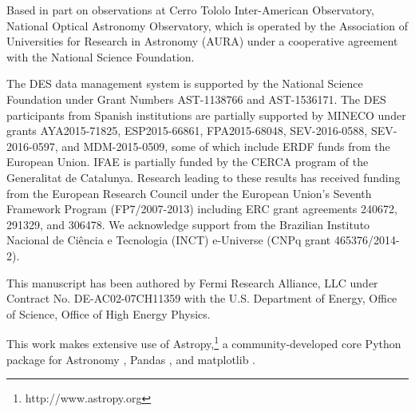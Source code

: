 \documentclass[fleqn,usenatbib,]{mnras}
\begin{document}
Based in part on observations at Cerro Tololo Inter-American Observatory, National Optical Astronomy Observatory, which is operated by the Association of 
Universities for Research in Astronomy (AURA) under a cooperative agreement with the National Science Foundation.

The DES data management system is supported by the National Science Foundation under Grant Numbers AST-1138766 and AST-1536171.
The DES participants from Spanish institutions are partially supported by MINECO under grants AYA2015-71825, ESP2015-66861, FPA2015-68048, SEV-2016-0588, SEV-2016-0597, and MDM-2015-0509, 
some of which include ERDF funds from the European Union. IFAE is partially funded by the CERCA program of the Generalitat de Catalunya.
Research leading to these results has received funding from the European Research
Council under the European Union's Seventh Framework Program (FP7/2007-2013) including ERC grant agreements 240672, 291329, and 306478.
We  acknowledge support from the Brazilian Instituto Nacional de Ci\^encia
e Tecnologia (INCT) e-Universe (CNPq grant 465376/2014-2).

This manuscript has been authored by Fermi Research Alliance, LLC under Contract No. DE-AC02-07CH11359 with the U.S. Department of Energy, Office of Science, Office of High Energy Physics.

This work makes extensive use of Astropy,\footnote{http://www.astropy.org} a community-developed core Python package for Astronomy \citep{AstropyCollaboration2013,AstropyCollaboration2018}, Pandas \citep{Mckinney2010}, and matplotlib \citep{Hunter2007}.








\end{document}
